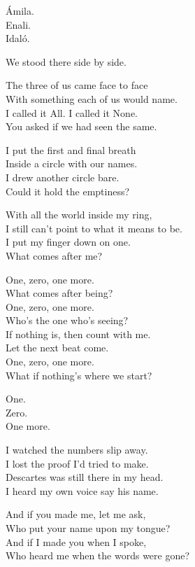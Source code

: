 \begin{lyrics}

Ámila.\\
Enali.\\
Idaló.

We stood there side by side.

The three of us came face to face\\
With something each of us would name.\\
I called it All. I called it None.\\
You asked if we had seen the same.

I put the first and final breath\\
Inside a circle with our names.\\
I drew another circle bare.\\
Could it hold the emptiness?

With all the world inside my ring,\\
I still can’t point to what it means to be.\\
I put my finger down on one.\\
What comes after me?

One, zero, one more.\\
What comes after being?\\
One, zero, one more.\\
Who’s the one who’s seeing?\\
If nothing is, then count with me.\\
Let the next beat come.\\
One, zero, one more.\\
What if nothing’s where we start?


One.\\
Zero.\\
One more.

I watched the numbers slip away.\\
I lost the proof I’d tried to make.\\
Descartes was still there in my head.\\
I heard my own voice say his name.

And if you made me, let me ask,\\
Who put your name upon my tongue?\\
And if I made you when I spoke,\\
Who heard me when the words were gone?


\end{lyrics}
